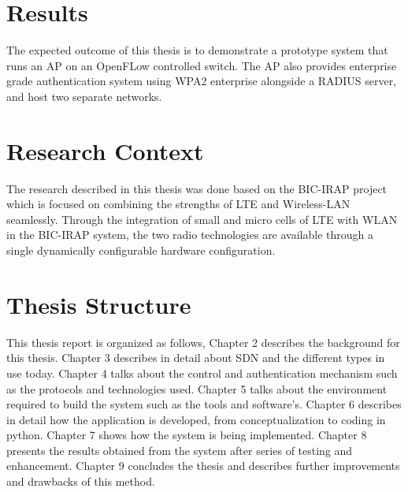 \section{Results}\label{sec:Results}
The expected outcome of this thesis is to demonstrate a prototype system that runs an AP on an OpenFLow controlled switch. The AP also provides enterprise grade authentication system using WPA2 enterprise alongside a RADIUS server, and host two separate networks. 

\section{Research Context\cite{BIC:IRAP}}\label{sec:BIC-IRAP}
The research described in this thesis was done based on the BIC-IRAP project which is focused on combining the strengths of LTE and Wireless-LAN seamlessly. Through the integration of small and micro cells of LTE with WLAN in the BIC-IRAP system, the two radio technologies are available through a single dynamically configurable hardware configuration.

\section{Thesis Structure}\label{sec:Structure}
This thesis report is organized as follows, Chapter 2 describes the background for this thesis. Chapter 3 describes in detail about SDN and the different types in use today. Chapter 4 talks about the control and authentication mechanism such as the protocols and technologies used. Chapter 5 talks about the environment required to build the system such as the tools and software’s. Chapter 6 describes in detail how the application is developed, from conceptualization to coding in python. Chapter 7 shows how the system is being implemented. Chapter 8 presents the results obtained from the system after series of testing and enhancement. Chapter 9 concludes the thesis and describes further improvements and drawbacks of this method.